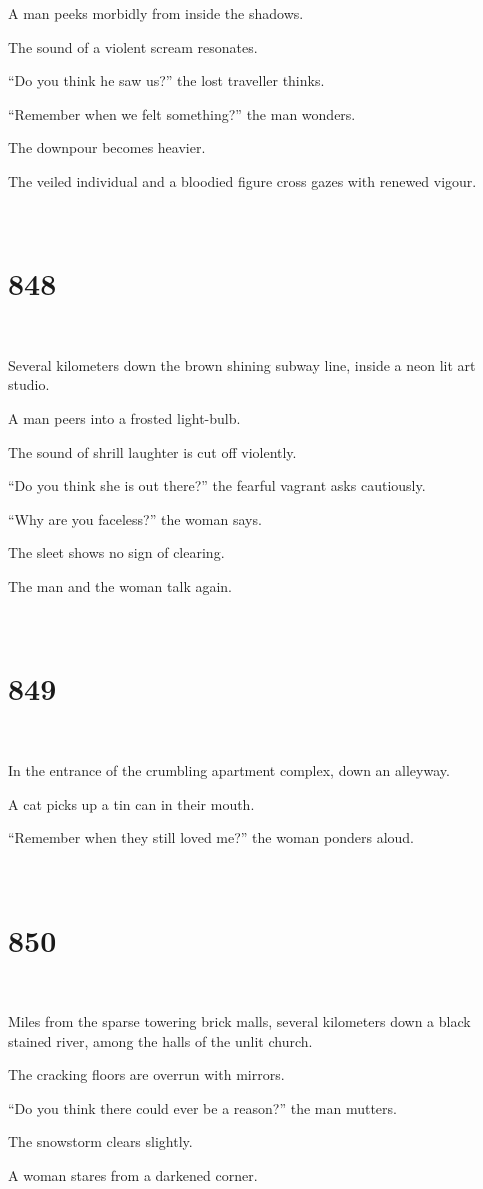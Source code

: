 \documentclass{report}
\begin{document}
A man peeks morbidly from inside the shadows.

The sound of a violent scream resonates.

``Do you think he saw us?'' the lost traveller thinks.

``Remember when we felt something?'' the man wonders.

The downpour becomes heavier.

The veiled individual and a bloodied figure cross gazes with renewed vigour.

~
\chapter*{848}
~

Several kilometers down the brown shining subway line, inside a neon lit art studio.

A man peers into a frosted light-bulb.

The sound of shrill laughter is cut off violently.

``Do you think she is out there?'' the fearful vagrant asks cautiously.

``Why are you faceless?'' the woman says.

The sleet shows no sign of clearing.

The man and the woman talk again.

~
\chapter*{849}
~

In the entrance of the crumbling apartment complex, down an alleyway.

A cat picks up a tin can in their mouth.

``Remember when they still loved me?'' the woman ponders aloud.

~
\chapter*{850}
~

Miles from the sparse towering brick malls, several kilometers down a black stained river, among the halls of the unlit church.

The cracking floors are overrun with mirrors.

``Do you think there could ever be a reason?'' the man mutters.

The snowstorm clears slightly.

A woman stares from a darkened corner.
\end{document}
